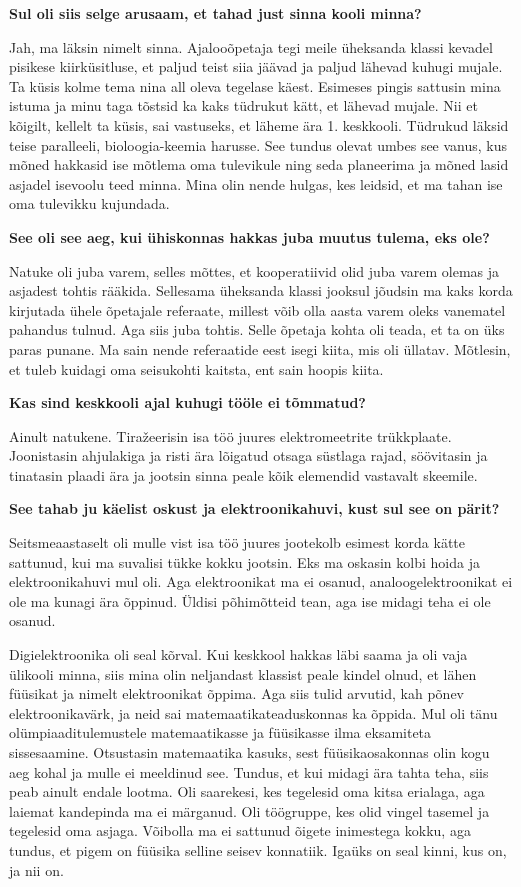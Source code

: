 \textbf{Sul oli siis selge arusaam, et tahad just sinna kooli
minna?}

Jah, ma läksin nimelt sinna. Ajalooõpetaja tegi meile 
üheksanda klassi kevadel pisikese kiirküsitluse, et paljud teist siia jäävad
ja paljud lähevad kuhugi mujale. Ta küsis kolme tema nina all oleva
tegelase käest. Esimeses pingis sattusin mina istuma ja minu taga tõstsid ka kaks
tüdrukut kätt, et lähevad mujale. Nii et kõigilt,
kellelt ta küsis, sai vastuseks, et läheme ära 1. keskkooli. Tüdrukud läksid
teise paralleeli, bioloogia-keemia harusse. See tundus olevat umbes see vanus,
kus mõned hakkasid ise mõtlema oma tulevikule ning seda planeerima ja mõned
lasid asjadel isevoolu teed minna. Mina olin nende hulgas, kes leidsid, et ma
tahan ise oma tulevikku kujundada.

\textbf{See oli see aeg, kui ühiskonnas hakkas juba muutus tulema, eks
ole?}

Natuke oli juba varem, selles mõttes, et kooperatiivid olid juba varem olemas
ja asjadest tohtis rääkida. Sellesama üheksanda klassi jooksul jõudsin ma kaks
korda kirjutada ühele õpetajale referaate, millest võib olla aasta varem oleks
vanematel pahandus tulnud. Aga siis juba tohtis. Selle õpetaja kohta oli teada,
et ta on üks paras punane. Ma sain nende referaatide eest isegi kiita, mis oli
üllatav. Mõtlesin, et tuleb kuidagi oma seisukohti kaitsta, ent sain hoopis
kiita.

\textbf{Kas sind keskkooli ajal kuhugi tööle ei tõmmatud?}

Ainult natukene. Tiražeerisin isa töö juures elektromeetrite trükkplaate.
Joonistasin ahjulakiga ja risti ära lõigatud otsaga süstlaga rajad, söövitasin ja tinatasin
plaadi ära ja jootsin sinna peale kõik elemendid vastavalt
skeemile.

\textbf{See tahab ju käelist oskust ja elektroonikahuvi, kust sul
see on pärit?}

Seitsmeaastaselt oli mulle vist isa töö juures jootekolb esimest korda kätte
sattunud, kui ma suvalisi tükke kokku jootsin. Eks ma oskasin kolbi hoida ja
elektroonikahuvi mul oli. Aga elektroonikat ma ei osanud, analoogelektroonikat
ei ole ma kunagi ära õppinud. Üldisi põhimõtteid tean, aga ise midagi teha ei
ole osanud.

Digielektroonika oli seal kõrval. Kui keskkool hakkas läbi saama ja oli vaja
ülikooli minna, siis mina olin neljandast klassist peale kindel olnud, et
lähen füüsikat ja nimelt elektroonikat õppima. Aga siis tulid arvutid, kah
põnev elektroonikavärk, ja neid sai matemaatikateaduskonnas ka õppida. Mul oli tänu olümpiaaditulemustele
matemaatikasse ja füüsikasse ilma eksamiteta sissesaamine. Otsustasin matemaatika kasuks, sest
füüsikaosakonnas olin kogu aeg kohal ja mulle ei meeldinud see. Tundus, et
kui midagi ära tahta teha, siis peab ainult endale lootma. Oli 
saarekesi, kes tegelesid oma kitsa erialaga, aga laiemat kandepinda ma ei
märganud. Oli töögruppe, kes olid vingel tasemel ja tegelesid oma asjaga. Võibolla ma ei sattunud õigete inimestega kokku, aga tundus, et pigem on
füüsika selline seisev konnatiik. Igaüks on seal kinni, kus on, ja nii on.

